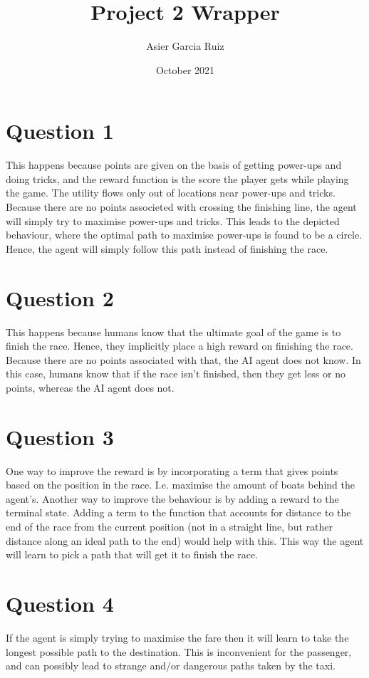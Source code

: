 \documentclass{article}
\title{Project 2 Wrapper}
\author{Asier Garcia Ruiz }
\date{October 2021}
\begin{document}
\maketitle
\section*{Question 1}
This happens because points are given on the basis of getting power-ups and doing tricks,
and the reward function is the score the player gets while playing the game.
The utility flows only out of locations near power-ups and tricks.
Because there are no points associeted with crossing the finishing line, the agent
will simply try to maximise power-ups and tricks. This leads to the depicted behaviour,
where the optimal path to maximise power-ups is found to be a circle. Hence, the agent
will simply follow this path instead of finishing the race.

\section*{Question 2}
This happens because humans know that the ultimate goal of the game is to finish the race.
Hence, they implicitly place a high reward on finishing the race.
Because there are no points associated with that, the AI agent does not know.
In this case, humans know that if the race isn't finished, then they get less or no
points, whereas the AI agent does not.

\section*{Question 3}
One way to improve the reward is by incorporating a term that gives points based
on the position in the race. I.e. maximise the amount of boats behind the agent's.
Another way to improve the behaviour is by adding a reward to the terminal state.
Adding a term to the function that accounts for distance to the end of the race
from the current position (not in a straight line, but rather distance along an
ideal path to the end) would help with this.
This way the agent will learn to pick a path that will get it to finish the race.

\section*{Question 4}
If the agent is simply trying to maximise the fare then it will learn to take
the longest possible path to the destination. This is inconvenient for the
passenger, and can possibly lead to strange and/or dangerous paths taken
by the taxi.
\end{document}
